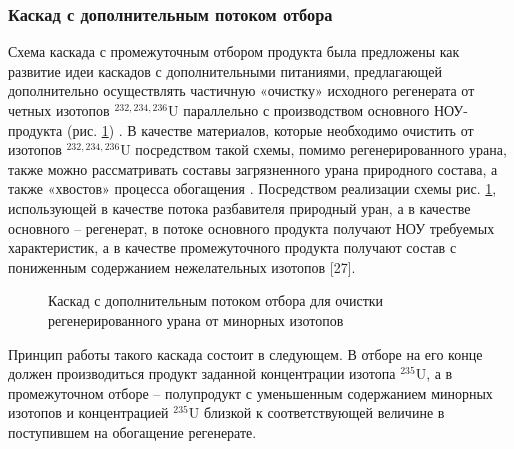 \subsubsection{Каскад с дополнительным потоком отбора}

Схема каскада с промежуточным отбором продукта была предложены как развитие идеи каскадов с дополнительными питаниями, предлагающей дополнительно осуществлять частичную
«очистку» исходного регенерата от четных изотопов $^{232,234,236}$U параллельно с производством основного НОУ-продукта (рис. \ref{fig:3_out}) \cite{zhurinSPOSOBPERERABOTKIZAGRYaZNENNOGO, palkinAnaliticheskiyRaschetSoderzhaniya2007}. В качестве материалов, которые необходимо очистить от изотопов $^{232,234,236}$U посредством такой схемы, помимо регенерированного урана, также можно рассматривать составы загрязненного урана природного состава, а также «хвостов» процесса обогащения \cite{palkinSeparationUraniumIsotopes2010}. Посредством реализации схемы рис. \ref{fig:3_out}, использующей в качестве потока разбавителя природный уран, а в качестве основного -- регенерат, в потоке основного продукта получают НОУ требуемых характеристик, а в качестве промежуточного продукта получают состав с пониженным содержанием нежелательных изотопов [27].
\begin{figure}[ht]
  \caption{Каскад с дополнительным потоком отбора для очистки регенерированного урана от минорных изотопов}\label{fig:3_out}
\end{figure}

Принцип работы такого каскада состоит в следующем. В отборе на его конце должен производиться продукт заданной концентрации изотопа $^{235}$U, а в промежуточном отборе -- полупродукт с уменьшенным содержанием минорных изотопов и концентрацией $^{235}$U близкой к соответствующей величине в поступившем на обогащение регенерате.

